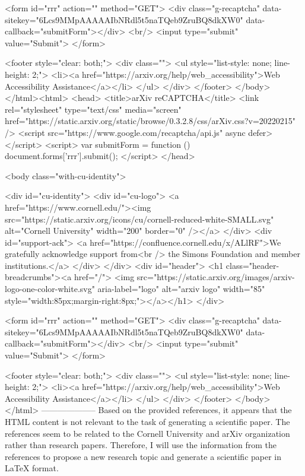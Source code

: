        <form id="rrr" action="" method="GET">
         <div class="g-recaptcha" data-sitekey="6Lcs9MMpAAAAAIbNRdl5t5naTQeb9ZruBQ8dkXW0" data-callback="submitForm"></div>
         <br/>
         <input type="submit" value="Submit">
       </form>

       <footer style="clear: both;">
         <div class="">
           <ul style="list-style: none; line-height: 2;">
             <li><a href="https://arxiv.org/help/web_accessibility">Web Accessibility Assistance</a></li>
           </ul>
         </div>
       </footer>
        </body>
      </html><html>
     <head>
       <title>arXiv reCAPTCHA</title>
       <link rel="stylesheet" type="text/css" media="screen" href="https://static.arxiv.org/static/browse/0.3.2.8/css/arXiv.css?v=20220215" />
       <script src="https://www.google.com/recaptcha/api.js" async defer></script>
       <script>
         var submitForm = function () {
             document.forms['rrr'].submit();
         }
       </script>
     </head>

     <body class="with-cu-identity">

       <div id="cu-identity">
         <div id="cu-logo">
           <a href="https://www.cornell.edu/"><img src="https://static.arxiv.org/icons/cu/cornell-reduced-white-SMALL.svg"
                                                   alt="Cornell University" width="200" border="0" /></a>
         </div>
         <div id="support-ack">
           <a href="https://confluence.cornell.edu/x/ALlRF">We gratefully acknowledge support from<br />
             the Simons Foundation and member institutions.</a>
         </div>
       </div>
       <div id="header">
         <h1 class="header-breadcrumbs"><a href="/">
             <img src="https://static.arxiv.org/images/arxiv-logo-one-color-white.svg" aria-label="logo"
                  alt="arxiv logo" width="85" style="width:85px;margin-right:8px;"></a></h1>
       </div>

       <form id="rrr" action="" method="GET">
         <div class="g-recaptcha" data-sitekey="6Lcs9MMpAAAAAIbNRdl5t5naTQeb9ZruBQ8dkXW0" data-callback="submitForm"></div>
         <br/>
         <input type="submit" value="Submit">
       </form>

       <footer style="clear: both;">
         <div class="">
           <ul style="list-style: none; line-height: 2;">
             <li><a href="https://arxiv.org/help/web_accessibility">Web Accessibility Assistance</a></li>
           </ul>
         </div>
       </footer>
        </body>
      </html>
        --------------------
         Based on the provided references, it appears that the HTML content is not relevant to the task of generating a scientific paper. The references seem to be related to the Cornell University and arXiv organization rather than research papers. Therefore, I will use the information from the references to propose a new research topic and generate a scientific paper in LaTeX format.

